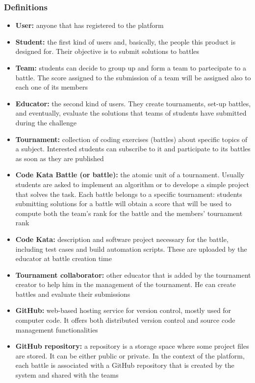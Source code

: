\subsubsection{Definitions}
\begin{itemize}
    \item {\textbf{User:} anyone that has registered to the platform}
    \item {\textbf{Student:} the first kind of users and, basically, the people this product is designed for. Their objective is to submit solutions to battles}
    \item {\textbf{Team:} students can decide to group up and form a team to partecipate to a battle. The score assigned to the submission of a team will be assigned also to each one of its members}
    \item {\textbf{Educator:} the second kind of users. They create tournaments, set-up battles, and eventually, evaluate the solutions that teams of students have submitted during the challenge}
    \item {\textbf{Tournament:} collection of coding exercises (battles) about specific topics of a subject. Interested students can subscribe to it and participate to its battles as soon as they are published}
    \item {\textbf{Code Kata Battle (or battle):} the atomic unit of a tournament. Usually students are asked to implement an algorithm or to develope a simple project that solves the task. Each battle belongs to a specific tournament: students submitting solutions for a battle will obtain a score that will be used to compute both the team's rank for the battle and the members' tournament rank}
    \item {\textbf{Code Kata:} description and software project necessary for the battle, including test cases and build automation scripts. These are uploaded by the educator at battle creation time}
    \item {\textbf{Tournament collaborator:} other educator that is added by the tournament creator to help him in the management of the tournament. He can create battles and evaluate their submissions}
    \item {\textbf{GitHub:} web-based hosting service for version control, mostly used for computer code. It offers both distributed version control and source code management functionalities}
    \item {\textbf{GitHub repository:} a repository is a storage space where some project files are stored. It can be either public or private. In the context of the platform, each battle is associated with a GitHub repository that is created by the system and shared with the teams}

\end{itemize}
